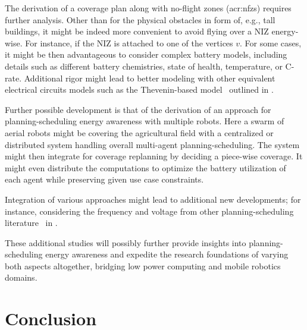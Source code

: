 
The derivation of a coverage plan along with no-flight zones (\Gls{acr:nfz}s) requires further analysis. Other than for the physical obstacles in form of, e.g., tall buildings, it might be indeed more convenient to avoid flying over a NIZ energy-wise. For instance, if the NIZ is attached to one of the vertices $v$. For some cases, it might be then advantageous to consider complex battery models, including details such as different battery chemistries, state of health, temperature, or C-rate. Additional rigor might lead to better modeling with other equivalent electrical circuits models such as the Thevenin-based model~\citep{chen2006accurate,hasan2018exogenous,hinz2019comparison,mousavi2014various,zhang2018online,salameh1992mathematical} outlined in .


Further possible development is that of the derivation of an approach for planning-scheduling energy awareness with multiple robots. Here a swarm of aerial robots might be covering the agricultural field with a centralized or distributed system handling overall multi-agent planning-scheduling. The system might then integrate  for coverage replanning by deciding a piece-wise coverage. It might even distribute the computations to optimize the battery utilization of each agent while preserving given use case constraints.

Integration of various approaches might lead to additional new developments; for instance, considering the frequency and voltage from other planning-scheduling literature~\citep{zhang2007low,brateman2006energy} in .

These additional studies will possibly further provide insights into planning-scheduling energy awareness and expedite the research foundations of varying both aspects altogether, bridging low power computing and mobile robotics domains.




\section{\color{red}Conclusion}
\label{sec:conc-conc}

